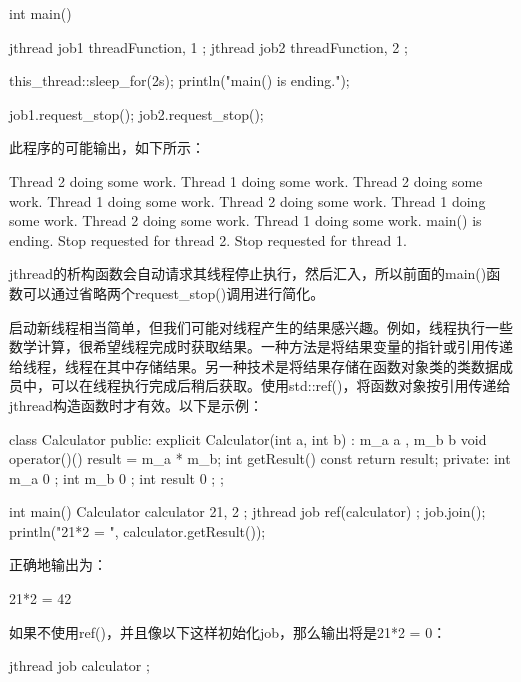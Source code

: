 \begin{cpp}
int main()
{
    jthread job1 { threadFunction, 1 };
    jthread job2 { threadFunction, 2 };

    this_thread::sleep_for(2s);
    println("main() is ending.");

    job1.request_stop();
    job2.request_stop();
}
\end{cpp}

此程序的可能输出，如下所示：

\begin{shell}
Thread 2 doing some work.
Thread 1 doing some work.
Thread 2 doing some work.
Thread 1 doing some work.
Thread 2 doing some work.
Thread 1 doing some work.
Thread 2 doing some work.
Thread 1 doing some work.
main() is ending.
Stop requested for thread 2.
Stop requested for thread 1.
\end{shell}

jthread的析构函数会自动请求其线程停止执行，然后汇入，所以前面的main()函数可以通过省略两个request\_stop()调用进行简化。


启动新线程相当简单，但我们可能对线程产生的结果感兴趣。例如，线程执行一些数学计算，很希望线程完成时获取结果。一种方法是将结果变量的指针或引用传递给线程，线程在其中存储结果。另一种技术是将结果存储在函数对象类的类数据成员中，可以在线程执行完成后稍后获取。使用std::ref()，将函数对象按引用传递给jthread构造函数时才有效。以下是示例：

\begin{cpp}
class Calculator
{
    public:
        explicit Calculator(int a, int b) : m_a { a }, m_b { b } {}
        void operator()() { result = m_a * m_b; }
        int getResult() const { return result; }
    private:
        int m_a { 0 };
        int m_b { 0 };
        int result { 0 };
};

int main()
{
    Calculator calculator { 21, 2 };
    jthread job { ref(calculator) };
    job.join();
    println("21*2 = {}", calculator.getResult());
}
\end{cpp}

正确地输出为：

\begin{shell}
21*2 = 42
\end{shell}

如果不使用ref()，并且像以下这样初始化job，那么输出将是21*2 = 0：

\begin{cpp}
jthread job { calculator };
\end{cpp}

